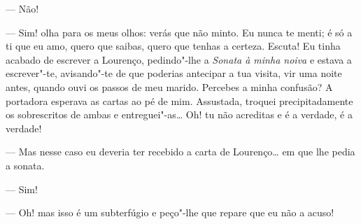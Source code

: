 --- Não!

--- Sim! olha para os meus olhos: verás que não minto. Eu nunca te
menti; é só a ti que eu amo, quero que saibas, quero que tenhas a
certeza. Escuta! Eu tinha acabado de escrever a Lourenço, pedindo"-lhe a
\emph{Sonata à minha noiva} e estava a escrever"-te, avisando"-te de que
poderias antecipar a tua visita, vir uma noite antes, quando ouvi os
passos de meu marido. Percebes a minha confusão? A portadora esperava as
cartas ao pé de mim. Assustada, troquei precipitadamente os sobrescritos
de ambas e entreguei"-as\ldots{} Oh! tu não acreditas e é a verdade, é a
verdade!

--- Mas nesse caso eu deveria ter recebido a carta de Lourenço\ldots{} em que
lhe pedia a sonata.

--- Sim!

--- Oh! mas isso é um subterfúgio e peço"-lhe que repare que eu não a
acuso!


